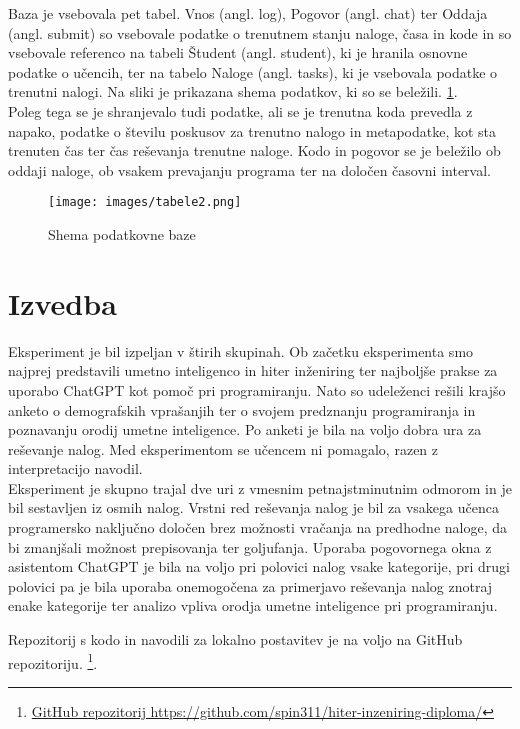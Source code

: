 \documentclass[a4paper,12pt,openright]{book}
\begin{document}
Baza je vsebovala pet tabel. Vnos (angl. log), Pogovor (angl. chat) ter Oddaja (angl. submit) so vsebovale podatke o trenutnem stanju naloge, časa in kode in so vsebovale referenco na tabeli Študent (angl. student), ki je hranila osnovne podatke o učencih, ter na tabelo Naloge (angl. tasks), ki je vsebovala podatke o trenutni nalogi. Na sliki je prikazana shema podatkov, ki so se beležili. \ref{fig:baze}. \\ 
Poleg tega se je shranjevalo tudi podatke, ali se je trenutna koda prevedla z napako, podatke o številu poskusov za trenutno nalogo in metapodatke, kot sta trenuten čas ter čas reševanja trenutne naloge. Kodo in pogovor se je beležilo ob oddaji naloge, ob vsakem prevajanju programa ter na določen časovni interval.

\begin{figure}[H]
    \centering
    \texttt{[image: images/tabele2.png]}
    \caption{Shema podatkovne baze}
    \label{fig:baze}
\end{figure}


\section{Izvedba}

Eksperiment je bil izpeljan v štirih skupinah. Ob začetku eksperimenta smo najprej predstavili umetno inteligenco in hiter inženiring ter najboljše prakse za uporabo ChatGPT kot pomoč pri programiranju. Nato so udeleženci rešili krajšo anketo o demografskih vprašanjih ter o svojem predznanju programiranja in poznavanju orodij umetne inteligence. Po anketi je bila na voljo dobra ura za reševanje nalog. Med eksperimentom se učencem ni pomagalo, razen z interpretacijo navodil. \\
Eksperiment je skupno trajal dve uri z vmesnim petnajstminutnim odmorom in je bil sestavljen iz osmih nalog. Vrstni red reševanja nalog je bil za vsakega učenca programersko naključno določen brez možnosti vračanja na predhodne naloge, da bi zmanjšali možnost prepisovanja ter goljufanja. Uporaba pogovornega okna z asistentom ChatGPT je bila na voljo pri polovici nalog vsake kategorije, pri drugi polovici pa je bila uporaba onemogočena za primerjavo reševanja nalog znotraj enake kategorije ter analizo vpliva orodja umetne inteligence pri programiranju.

Repozitorij s kodo in navodili za lokalno postavitev je na voljo na GitHub repozitoriju. \footnote{\href{https://github.com/spin311/hiter-inzeniring-diploma/}{GitHub repozitorij https://github.com/spin311/hiter-inzeniring-diploma/}}.
\end{document}
